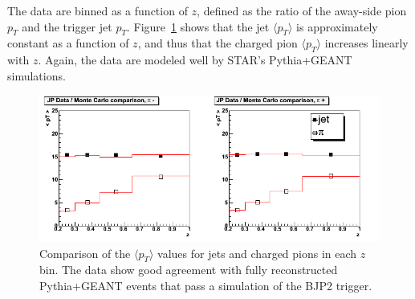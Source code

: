 The data are binned as a function of \(z\), defined as the ratio of the
away-side pion \(p_T\) and the trigger jet \(p_T\). Figure~\ref{fig:meanpt}
shows that the jet \(\langle p_T \rangle\) is approximately constant as a
function of \(z\), and thus that the charged pion \(\langle p_T \rangle\)
increases linearly with \(z\). Again, the data are modeled well by STAR's
Pythia+GEANT simulations.

\begin{figure}
  \centering
  \includegraphics[width=1.0\textwidth]{figures/meanpt}
  \caption{Comparison of the $\langle p_T \rangle$ values for jets and charged pions in each $z$ bin.  The data show good agreement with fully reconstructed Pythia+GEANT events that pass a simulation of the BJP2 trigger.}
  \label{fig:meanpt}
\end{figure}
